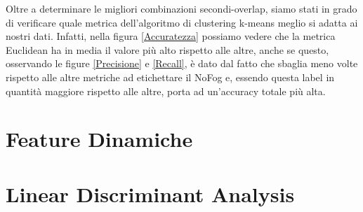Oltre a determinare le migliori combinazioni secondi-overlap, siamo stati in grado di verificare quale metrica dell'algoritmo di clustering k-means meglio si adatta ai nostri dati. Infatti, nella figura \ref{Accuratezza} possiamo vedere che la metrica Euclidean ha in media il valore più alto rispetto alle altre, anche se questo, osservando le figure \ref{Precisione} e \ref{Recall}, è dato dal fatto che sbaglia meno volte rispetto alle altre metriche ad etichettare il NoFog e, essendo questa label in quantità maggiore rispetto alle altre, porta ad un'accuracy totale più alta.\\

\section{Feature Dinamiche}


\section{Linear Discriminant Analysis}












